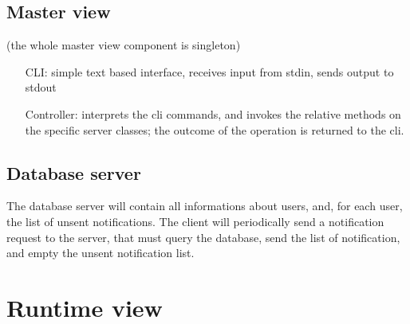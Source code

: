 	\subsection{Master view}
	(the whole master view component is singleton)
	\begin{itemize}
	  \item [CLI:] simple text based interface, receives input from stdin, sends output to stdout
	  \item [Controller:] interprets the cli commands, and invokes the relative methods on the specific server classes;
	  the outcome of the operation is returned to the cli.
	\end{itemize}
	\subsection{Database server}
	The database server will contain all informations about users, and, for each user, the list of unsent notifications.
	The client will periodically send a notification request to the server, that must query the database, send the list of notification,
	and empty the unsent notification list.
\newpage
\section{Runtime view}
